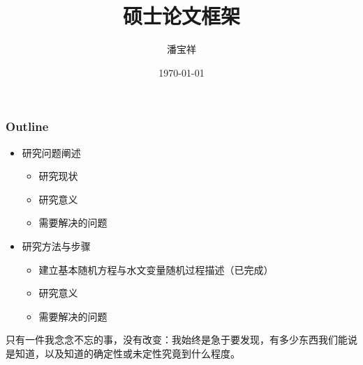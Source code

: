 \documentclass{beamer}
\begin{document}
\begin{CJK}{UTF8}{gkai}
\title{硕士论文框架}
\date{\today}
\author{潘宝祥}
\maketitle
\begin{frame}
\frametitle{Outline}
\begin{itemize}
\item 研究问题阐述
\begin{itemize}
\item 研究现状
\item 研究意义
\item 需要解决的问题
\end{itemize}
\item 研究方法与步骤
\begin{itemize}
\item 建立基本随机方程与水文变量随机过程描述（已完成）
\item 研究意义
\item 需要解决的问题
\end{itemize}
\end{itemize}
\end{frame}


\begin{frame}
只有一件我念念不忘的事，没有改变：我始终是急于要发现，有多少东西我们能说是知道，以及知道的确定性或未定性究竟到什么程度。
\end{frame}


\end{CJK}
\end{document}
